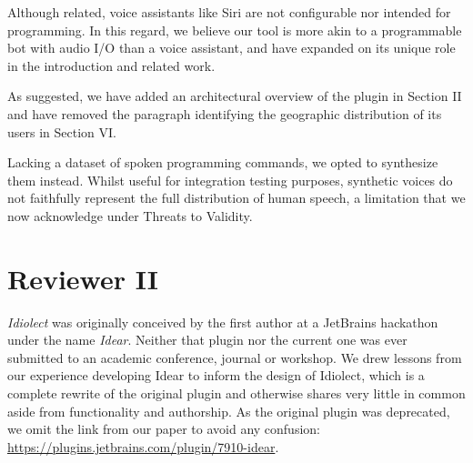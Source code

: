 \documentclass[journal,12pt,onecolumn,draftclsnofoot,]{IEEEtran}
\begin{document}
%
%
%

Although related, voice assistants like Siri are not configurable nor intended for programming. In this regard, we believe our tool is more akin to a programmable bot with audio I/O than a voice assistant, and have expanded on its unique role in the introduction and related work.

As suggested, we have added an architectural overview of the plugin in Section II and have removed the paragraph identifying the geographic distribution of its users in Section VI.



Lacking a dataset of spoken programming commands, we opted to synthesize them instead. Whilst useful for integration testing purposes, synthetic voices do not faithfully represent the full distribution of human speech, a limitation that we now acknowledge under Threats to Validity.

\section{Reviewer II}

\textit{Idiolect} was originally conceived by the first author at a JetBrains hackathon under the name \textit{Idear}. Neither that plugin nor the current one was ever submitted to an academic conference, journal or workshop. We drew lessons from our experience developing Idear to inform the design of Idiolect, which is a complete rewrite of the original plugin and otherwise shares very little in common aside from functionality and authorship. As the original plugin was deprecated, we omit the link from our paper to avoid any confusion: \url{https://plugins.jetbrains.com/plugin/7910-idear}.
\end{document}
